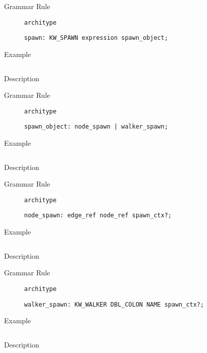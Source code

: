 \begin{description}
    \item[Grammar Rule] \texttt{architype}
          \begin{lstlisting}[style=gram]
spawn: KW_SPAWN expression spawn_object;
\end{lstlisting}
    \item[Example] \texttt{}
          \begin{lstlisting}
    \end{lstlisting}

    \item[Description]
\end{description}


\begin{description}
    \item[Grammar Rule] \texttt{architype}
          \begin{lstlisting}[style=gram]
spawn_object: node_spawn | walker_spawn;
\end{lstlisting}
    \item[Example] \texttt{}
          \begin{lstlisting}
    \end{lstlisting}

    \item[Description]
\end{description}


\begin{description}
    \item[Grammar Rule] \texttt{architype}
          \begin{lstlisting}[style=gram]
node_spawn: edge_ref node_ref spawn_ctx?;
\end{lstlisting}
    \item[Example] \texttt{}
          \begin{lstlisting}
    \end{lstlisting}

    \item[Description]
\end{description}


\begin{description}
    \item[Grammar Rule] \texttt{architype}
          \begin{lstlisting}[style=gram]
walker_spawn: KW_WALKER DBL_COLON NAME spawn_ctx?;
\end{lstlisting}
    \item[Example] \texttt{}
          \begin{lstlisting}
    \end{lstlisting}

    \item[Description]
\end{description}


